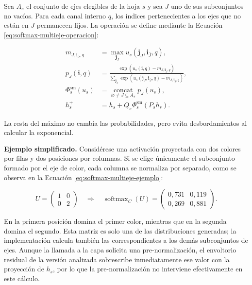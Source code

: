 \documentclass[11pt,a4paper,spanish]{book}
\numberwithin{equation}{chapter}
\numberwithin{figure}{chapter}
\begin{document}
Sea \(A_s\) el conjunto de ejes elegibles de la hoja \(s\) y sea \(J\) uno de sus subconjuntos no vacíos. Para cada canal interno
\(q\), los índices pertenecientes a los ejes que no están en \(J\) permanecen fijos. La operación se define mediante la Ecuación
\eqref{eq:softmax-multieje-operacion}:

\begin{equation}\label{eq:softmax-multieje-operacion}
\begin{aligned}
m_{J,\mathbf{i}_{\bar J},q}
    &=\max_{\mathbf{j}_J}
      u_s(\mathbf{j}_J,\mathbf{i}_{\bar J},q),\\
p_J(\mathbf{i},q)
    &=\frac{\exp\!\left(u_s(\mathbf{i},q)-m_{J,\mathbf{i}_{\bar J},q}\right)}
      {\displaystyle\sum_{\mathbf{j}_J}
       \exp\!\left(u_s(\mathbf{j}_J,\mathbf{i}_{\bar J},q)
       -m_{J,\mathbf{i}_{\bar J},q}\right)},\\
\Phi_s^{\mathrm{sm}}(u_s)
    &=\underset{\varnothing\neq J\subseteq A_s}{\operatorname{concat}}p_J(u_s),\\
h_s^{+}
    &=h_s+Q_s\Phi_s^{\mathrm{sm}}(P_s h_s).
\end{aligned}
\end{equation}

La resta del máximo no cambia las probabilidades, pero evita desbordamientos al calcular la exponencial.

\textbf{Ejemplo simplificado.} Considérese una activación proyectada con dos colores por filas y dos posiciones por columnas. Si se
elige únicamente el subconjunto formado por el eje de color, cada columna se normaliza por separado, como se observa en la Ecuación
\eqref{eq:softmax-multieje-ejemplo}:

\begin{equation}\label{eq:softmax-multieje-ejemplo}
U=\begin{pmatrix}1&0\\0&2\end{pmatrix}
\quad\Longrightarrow\quad
\operatorname{softmax}_{C}(U)
=\begin{pmatrix}
0{,}731&0{,}119\\
0{,}269&0{,}881
\end{pmatrix}.
\end{equation}

En la primera posición domina el primer color, mientras que en la segunda domina el segundo. Esta matriz es solo una de las
distribuciones generadas; la implementación calcula también las correspondientes a los demás subconjuntos de ejes. Aunque la llamada
a la capa solicita una pre-normalización, el envoltorio residual de la versión analizada sobrescribe inmediatamente ese valor con la
proyección de \(h_s\), por lo que la pre-normalización no interviene efectivamente en este cálculo.
\end{document}
